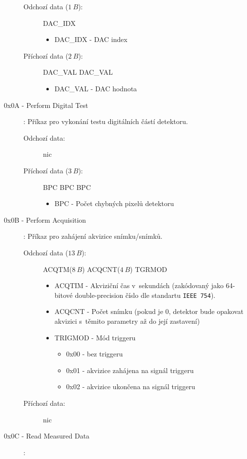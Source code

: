 \begin{description}
\begin{description}
			\item[Odchozí data ($1~B$):] DAC\_IDX
				\begin{itemize}
					\item DAC\_IDX - DAC index
				\end{itemize}
			\item[Příchozí data ($2~B$):] DAC\_VAL DAC\_VAL
				\begin{itemize}
					\item DAC\_VAL - DAC hodnota
				\end{itemize}
		\end{description}
	\item[0x0A - Perform Digital Test]:
		Příkaz pro vykonání testu digitálních částí detektoru.
		\begin{description}
			\item[Odchozí data:] nic
			\item[Příchozí data ($3~B$):] BPC BPC BPC
				\begin{itemize}
					\item BPC - Počet chybných pixelů detektoru
				\end{itemize}
		\end{description}
	\item[0x0B - Perform Acquisition]:
		Příkaz pro zahájení akvizice snímku/snímků.
		\begin{description}
			\item[Odchozí data ($13~B$):] ACQTM($8~B$) ACQCNT($4~B$) TGRMOD
				\begin{itemize}
					\item ACQTIM - Akviziční čas v~sekundách (zakódovaný jako 64-bitové double-precision číslo dle standartu \texttt{IEEE 754}).
					\item ACQCNT - Počet snímku (pokud je 0, detektor bude opakovat akvizici s~těmito parametry až do její zastavení)
					\item TRIGMOD - Mód triggeru
						\begin{itemize}
							\item 0x00 - bez triggeru
							\item 0x01 - akvizice zahájena na signál triggeru
							\item 0x02 - akvizice ukončena
							 na signál triggeru
						\end{itemize}
				\end{itemize}
			\item[Příchozí data:] nic
		\end{description}
	\item[0x0C - Read Measured Data]:

\end{description}
